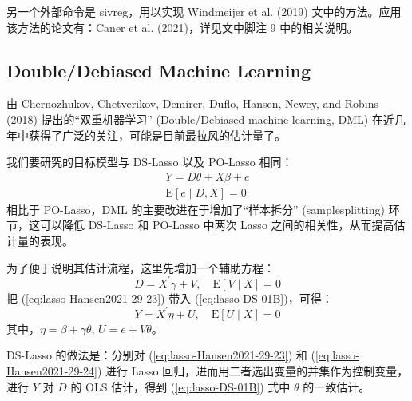 {另一个外部命令是 sivreg，用以实现 Windmeijer et al. (2019) 文中的方法。应用该方法的论文有：Caner et al. (2021)，详见文中脚注 9 中的相关说明。

\subsection{Double/Debiased Machine Learning}\label{sec:lasso-DML}
由 Chernozhukov, Chetverikov, Demirer, Duflo, Hansen, Newey, and Robins (2018) 提出的“双重机器学习” (Double/Debiased machine learning, DML) 在近几年中获得了广泛的关注，可能是目前最拉风的估计量了。%

我们要研究的目标模型与 DS-Lasso 以及 PO-Lasso 相同：
\begin{equation}\label{eq:lasso-DS-01B}
\begin{aligned}%
Y = D \theta + X \beta + e \\
\mathrm{E}[e \mid D, X] =0
\end{aligned}
\end{equation}
相比于 PO-Lasso，DML 的主要改进在于增加了“样本拆分” (samplesplitting) 环节，这可以降低 DS-Lasso 和 PO-Lasso 中两次 Lasso 之间的相关性，从而提高估计量的表现。

为了便于说明其估计流程，这里先增加一个辅助方程：
\begin{equation}\label{eq:lasso-Hansen2021-29-23}
D=X^{\prime} \gamma+V, \quad \mathrm{E}[V \mid X]=0
\end{equation}
把 (\ref{eq:lasso-Hansen2021-29-23}) 带入 (\ref{eq:lasso-DS-01B})，可得：
\begin{equation}\label{eq:lasso-Hansen2021-29-24}
Y=X^{\prime} \eta+U, \quad \mathrm{E}[U \mid X]=0
\end{equation}
其中，$\eta=\beta+\gamma \theta$, $U=e+V \theta$。

DS-Lasso 的做法是：分别对 (\ref{eq:lasso-Hansen2021-29-23}) 和 (\ref{eq:lasso-Hansen2021-29-24}) 进行 Lasso 回归，进而用二者选出变量的并集作为控制变量，进行 $Y$ 对 $D$ 的 OLS 估计，得到 (\ref{eq:lasso-DS-01B}) 式中 $\theta$ 的一致估计。

}
